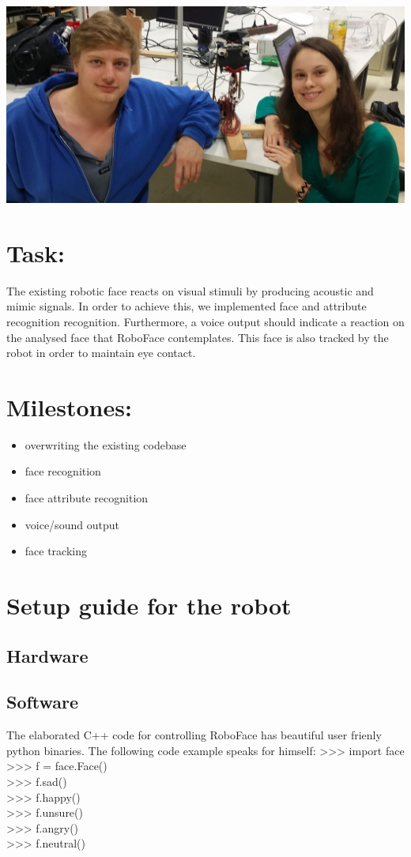 \documentclass[12.5pt]{scrartcl}
\begin{document}
	\vspace*{8mm}
	\begin{center}
		\includegraphics[width=0.88\linewidth]{images/faceEdited}
	\end{center}
	
	\section{Task:}
	The existing robotic face reacts on visual stimuli by producing acoustic and mimic signals. In order to achieve this, we implemented face and attribute recognition recognition. Furthermore, a voice output should indicate a reaction on the analysed face that RoboFace contemplates. This face is also tracked by the robot in order to maintain eye contact. 
	
	\section{Milestones:}
	\begin{itemize}
		\item overwriting the existing codebase
		\item face recognition
		\item face attribute recognition
		\item voice/sound output
		\item face tracking
	\end{itemize}

	\section{Setup guide for the robot}
	\subsection{Hardware}
	\subsection{Software}
	The elaborated C++ code for controlling RoboFace has beautiful user frienly python binaries. The following code example speaks for himself:
	>>> import face \\
	>>> f = face.Face()\\
	>>> f.sad()\\
	>>> f.happy()\\
	>>> f.unsure()\\
	>>> f.angry()\\
	>>> f.neutral()\\
\end{document}

